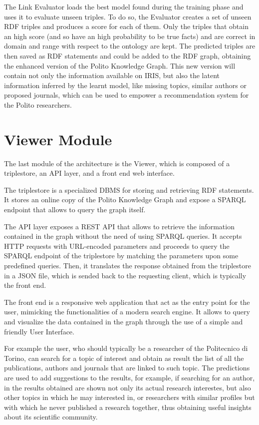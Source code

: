 \documentclass[%
    corpo=13.5pt,
    twoside,
    oldstyle,
    tipotesi=magistrale,
    greek,
    evenboxes
]{toptesi}
\begin{document}
The Link Evaluator loads the best model found during the training phase and
uses it to evaluate unseen triples.
To do so, the Evaluator creates a set of unseen RDF triples and produces a score
for each of them. Only the triples that obtain an high score (and so have an high
probability to be true facts) and are correct in domain and range with respect
to the ontology are kept.
The predicted triples are then saved as RDF statements and could be added
to the RDF graph, obtaining the enhanced version of the Polito Knowledge Graph.
This new version will contain not only the information available on IRIS, but
also the latent information inferred by the learnt model, like missing topics,
similar authors or proposed journals, which can be used to empower a
recommendation system for the Polito researchers.

\section{Viewer Module}

The last module of the architecture is the Viewer, which is composed of a
triplestore, an API layer, and a front end web interface.

The triplestore is a specialized DBMS for storing and retrieving RDF
statements.
It stores an online copy of the Polito Knowledge Graph and expose a
SPARQL endpoint that allows to query the graph itself.

The API layer exposes a REST API that allows to retrieve the information
contained in the graph without the need of using SPARQL queries. It accepts HTTP
requests with URL-encoded parameters and proceeds to query the SPARQL endpoint
of the triplestore by matching the parameters upon some predefined queries.
Then, it translates the response obtained from the triplestore in a JSON file,
which is sended back to the requesting client, which is typically the front end.

The front end is a responsive web application that act as the entry point for
the user, mimicking the functionalities of a modern search engine. It allows
to query and visualize the data contained in the graph through the use
of a simple and friendly User Interface.

For example the user, who should typically be a researcher of the Politecnico di
Torino, can search for a topic of interest and obtain as result the list of all
the publications, authors and journals that are linked to such topic.
The predictions are used to add suggestions to the results, for example,
if searching for an author, in the results obtained are shown not only its
actual research interestes, but also other topics in which he may interested in,
or researchers with similar profiles but with which he never published a
research together, thus obtaining useful insights about its scientific community.
\end{document}
